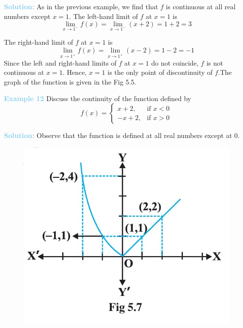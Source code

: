\documentclass[a4paper,12pt]{article}
\begin{document}
  
    
\noindent \textbf{\textcolor{skyblue}{Solution:}} As in the previous example, we find that $f$ is continuous at all real numbers except $x = 1$. The left-hand limit of $f$ at $x = 1$ is
\[
\lim\limits_{x \to 1^-} f(x) = \lim\limits_{x \to 1^-} (x+2) = 1+2 = 3
\]

\noindent The right-hand limit of $f$ at $x = 1$ is
\[
\lim\limits_{x \to 1^+} f(x) = \lim\limits_{x \to 1^+} (x-2) = 1-2 = -1
\]
\hspace{10pt} Since the left and right-hand limits of $f$ at $x = 1$ do not coincide, $f$ is not continuous at $x = 1$. Hence, $x = 1$ is the only point of discontinuity of $f$.The graph of the function is given in the Fig 5.5.

\hfill






\newpage
\pagestyle{fancy}       %
\fancyhf{}    

\noindent \textbf{\textcolor{skyblue}{Example 12}} Discuss the continuity of the function defined by
\[
f(x) = \begin{cases} 
    x + 2, & \text{if } x < 0 \\
    -x + 2, & \text{if } x > 0
\end{cases}
\]

\noindent \textbf{\textcolor{skyblue}{Solution:}} Observe that the function is defined at all real numbers except at $0$.

\begin{figure}
    \centering
    \hspace*{1cm} 
    \includegraphics[width=1\linewidth]{c.jpg}
\end{figure}
\end{document}

